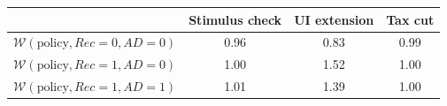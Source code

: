 \begin{tabular}{@{}lccc@{}} 
\toprule 
                          & Stimulus check      & UI extension    & Tax cut    \\  \midrule 
$\mathcal{W}(\text{policy}, Rec=0, AD=0)$ & 0.96  & 0.83  & 0.99     \\ 
$\mathcal{W}(\text{policy}, Rec=1, AD=0)$ & 1.00  & 1.52  & 1.00     \\ 
$\mathcal{W}(\text{policy}, Rec=1, AD=1)$ & 1.01  & 1.39  & 1.00     \\ \bottomrule 
\end{tabular}  
